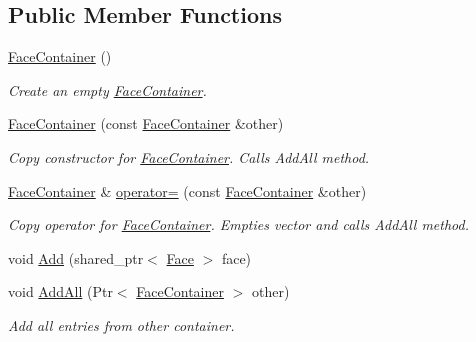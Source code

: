 \subsection*{Public Member Functions}
\begin{DoxyCompactItemize}
\item 
\hyperlink{classns3_1_1ndn_1_1FaceContainer_a13a19c76c09a7493ba22a649ed969c54}{Face\+Container} ()\hypertarget{classns3_1_1ndn_1_1FaceContainer_a13a19c76c09a7493ba22a649ed969c54}{}\label{classns3_1_1ndn_1_1FaceContainer_a13a19c76c09a7493ba22a649ed969c54}

\begin{DoxyCompactList}\small\item\em Create an empty \hyperlink{classns3_1_1ndn_1_1FaceContainer}{Face\+Container}. \end{DoxyCompactList}\item 
\hyperlink{classns3_1_1ndn_1_1FaceContainer_aa2125a337517cb04a246655ee922867c}{Face\+Container} (const \hyperlink{classns3_1_1ndn_1_1FaceContainer}{Face\+Container} \&other)
\begin{DoxyCompactList}\small\item\em Copy constructor for \hyperlink{classns3_1_1ndn_1_1FaceContainer}{Face\+Container}. Calls Add\+All method. \end{DoxyCompactList}\item 
\hyperlink{classns3_1_1ndn_1_1FaceContainer}{Face\+Container} \& \hyperlink{classns3_1_1ndn_1_1FaceContainer_a655f82f01482c8cdcba33d58ce31f687}{operator=} (const \hyperlink{classns3_1_1ndn_1_1FaceContainer}{Face\+Container} \&other)
\begin{DoxyCompactList}\small\item\em Copy operator for \hyperlink{classns3_1_1ndn_1_1FaceContainer}{Face\+Container}. Empties vector and calls Add\+All method. \end{DoxyCompactList}\item 
void \hyperlink{classns3_1_1ndn_1_1FaceContainer_a6ac9a35eca3fb8a309fb40fa134750d9}{Add} (shared\+\_\+ptr$<$ \hyperlink{classnfd_1_1Face}{Face} $>$ face)
\item 
void \hyperlink{classns3_1_1ndn_1_1FaceContainer_acd767be2abe31d69ca02bd1a732bb439}{Add\+All} (Ptr$<$ \hyperlink{classns3_1_1ndn_1_1FaceContainer}{Face\+Container} $>$ other)
\begin{DoxyCompactList}\small\item\em Add all entries from other container. \end{DoxyCompactList}\item 

\end{DoxyCompactItemize}

